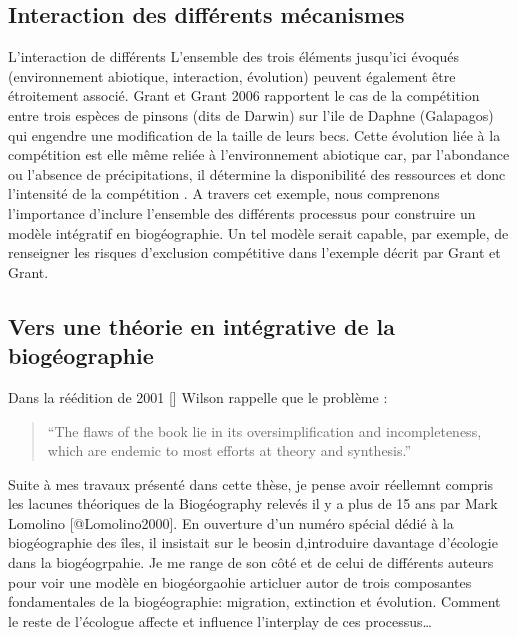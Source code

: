 \subsection{Interaction des différents
mécanismes}\label{interaction-des-diffuxe9rents-muxe9canismes}

L'interaction de différents L'ensemble des trois éléments jusqu'ici
évoqués (environnement abiotique, interaction, évolution) peuvent
également être étroitement associé. Grant et Grant 2006 rapportent le
cas de la compétition entre trois espèces de pinsons (dits de Darwin)
sur l'ile de Daphne (Galapagos) qui engendre une modification de la
taille de leurs becs. Cette évolution liée à la compétition est elle
même reliée à l'environnement abiotique car, par l'abondance ou
l'absence de précipitations, il détermine la disponibilité des
ressources et donc l'intensité de la compétition \cite{Grant2006}. A
travers cet exemple, nous comprenons l'importance d'inclure l'ensemble
des différents processus pour construire un modèle intégratif en
biogéographie. Un tel modèle serait capable, par exemple, de renseigner
les risques d'exclusion compétitive dans l'exemple décrit par Grant et
Grant.

\subsection*{Vers une théorie en intégrative de la
biogéographie}\label{vers-une-thuxe9orie-en-intuxe9grative-de-la-bioguxe9ographie}

Dans la réédition de 2001 {[}{]} Wilson rappelle que le problème :

\begin{quote}
``The flaws of the book lie in its oversimplification and
incompleteness, which are endemic to most efforts at theory and
synthesis.''
\end{quote}

Suite à mes travaux présenté dans cette thèse, je pense avoir réellemnt
compris les lacunes théoriques de la Biogéography relevés il y a plus de
15 ans par Mark Lomolino {[}@Lomolino2000{]}. En ouverture d'un numéro
spécial dédié à la biogéographie des îles, il insistait sur le beosin
d,introduire davantage d'écologie dans la biogéogrpahie. Je me range de
son côté et de celui de différents auteurs pour voir une modèle en
biogéorgaohie articluer autor de trois composantes fondamentales de la
biogéographie: migration, extinction et évolution. Comment le reste de
l'écologue affecte et influence l'interplay de ces processus\ldots{}

